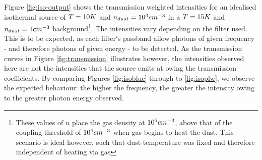 \documentclass{report}
\begin{document}
Figure \ref{fig:iso-output} shows the transmission weighted intensities for an idealised isothermal source of $T=10\/K$ and $n_{dust}=10^{3}\/cm^{-3}$ in a $T=15\/K$ and $n_{dust}=1\/cm^{-3}$ background\footnote{These values of $n$ place the gas density at $10^{5}\/cm^{-3}$, above that of the coupling threshold of
$10^{4}\/cm^{-3}$ when gas begins to heat the dust. This scenario is ideal however, such that dust temperature was fixed and therefore independent of heating via gas}. The intensities vary depending on the filter used. This is to be expected, as each filter`s passband allow photons of given frequency - and therefore photons of given energy - to be detected. As the transmission curves in Figure \ref{fig:transmission} illustrates however, the intensities observed here are not the intensities that the source emits at owing the transmission coefficients. By comparing Figures \ref{fig:isoblue} through to \ref{fig:isoplw}, we observe the expected behaviour: the higher the frequency, the greater the intensity owing to the greater photon energy observed.
\end{document}
